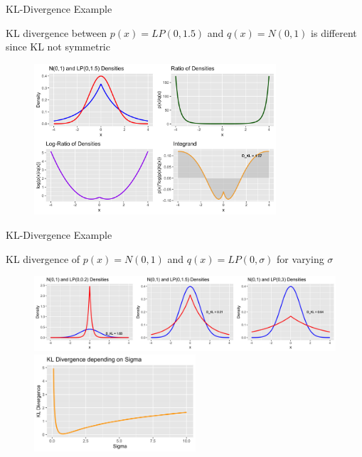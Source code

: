 \documentclass[11pt,compress,t,notes=noshow, xcolor=table]{beamer}
\begin{document}
\begin{vbframe} {KL-Divergence Example}

KL divergence between $p(x)=LP(0, 1.5)$ and $q(x)=N(0,1)$ is different since KL not symmetric

\begin{figure}
\includegraphics[width = 9cm ]{figure/kl_calculation_plot_2.png} 
\end{figure}

\end{vbframe}

\begin{vbframe} {KL-Divergence Example}

KL divergence of $p(x)=N(0,1)$ and $q(x)=LP(0, \sigma)$ for varying $\sigma$

\begin{figure}
\includegraphics[width = 12cm ]{figure/kl_norm_lp.png} 
\includegraphics[width = 6cm ]{figure/kl_norm_lp_sigma.png} 
\end{figure}


\end{vbframe}
\end{document}
